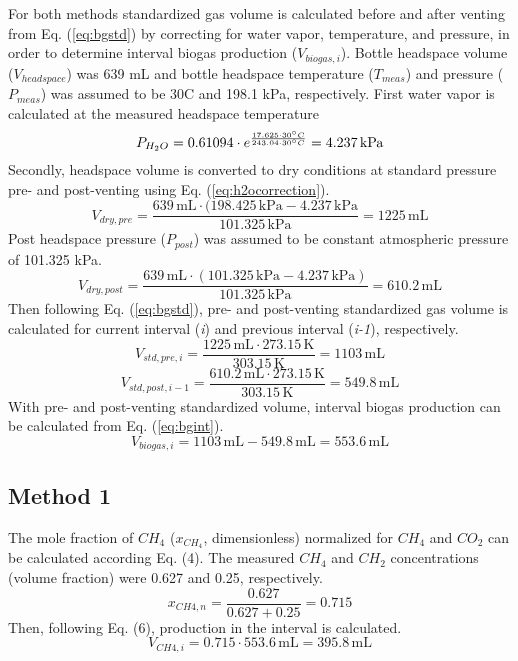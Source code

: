 \documentclass[]{article}
\newcommand{\unit}[1]{\ensuremath{\, \mathrm{#1}}}
\begin{document}
For both methods standardized gas volume is calculated before and after venting from Eq. (\ref{eq:bgstd}) by correcting for water vapor, temperature, and pressure, in order to determine interval biogas production ($V_{biogas,i}$). 
Bottle headspace volume ($V_{headspace}$) was 639 mL and bottle headspace temperature ($T_{meas}$) and pressure ($P_{meas}$) was assumed to be 30\degree C and 198.1 kPa, respectively. 
First water vapor is calculated at the measured headspace temperature
\begin{equation*}
    P_{H_{2}O} = 0.61094 \cdot e^\frac{17.625 \cdot 30\degree C}{243.04 \cdot 30\degree C} = 4.237\unit{kPa}
\end{equation*}
Secondly, headspace volume is converted to dry conditions at standard pressure pre- and post-venting using Eq. (\ref{eq:h2ocorrection}). 
\begin{equation*}
    V_{dry,pre} = \frac{639\unit{mL} \cdot (198.425\unit{kPa} - 4.237\unit{kPa}}{101.325\unit{kPa}} = 1225\unit{mL}
\end{equation*}
Post headspace pressure ($P_{post}$) was assumed to be constant atmospheric pressure of 101.325 kPa. 
\begin{equation*}
    V_{dry,post} = \frac{639\unit{mL} \cdot (101.325\unit{kPa} - 4.237\unit{kPa})}{101.325\unit{kPa}} = 610.2\unit{mL}
\end{equation*}
Then following Eq. (\ref{eq:bgstd}), pre- and post-venting standardized gas volume is calculated for current interval (\textit{i}) and previous interval (\textit{i-1}), respectively. 
\begin{equation*}
    V_{std,pre,i} = \frac{1225\unit{mL} \cdot 273.15\unit{K}}{303.15\unit{K}} = 1103\unit{mL}
\end{equation*}
\begin{equation*}
    V_{std,post,i-1} = \frac{610.2\unit{mL} \cdot 273.15\unit{K}}{303.15\unit{K}} = 549.8\unit{mL}
\end{equation*}
With pre- and post-venting standardized volume, interval biogas production can be calculated from Eq. (\ref{eq:bgint}).
\begin{equation*}
    V_{biogas,i} = 1103\unit{mL} - 549.8\unit{mL} = 553.6\unit{mL}
\end{equation*}
\subsection{Method 1}
The mole fraction of $CH_{4}$ ($x_{CH_4}$, dimensionless) normalized for $CH_{4}$ and $CO_{2}$ can be calculated according Eq. (4). The measured $CH_{4}$ and $CH_{2}$ concentrations (volume fraction) were 0.627 and 0.25, respectively.
\begin{equation*}
    x_{CH{4},n} = \frac{0.627}{0.627 + 0.25} = 0.715
\end{equation*}
Then, following Eq. (6),  production in the interval is calculated.
\begin{equation*}
    V_{CH{4},i} = 0.715 \cdot 553.6\unit{mL} = 395.8\unit{mL}
\end{equation*}
\end{document}
